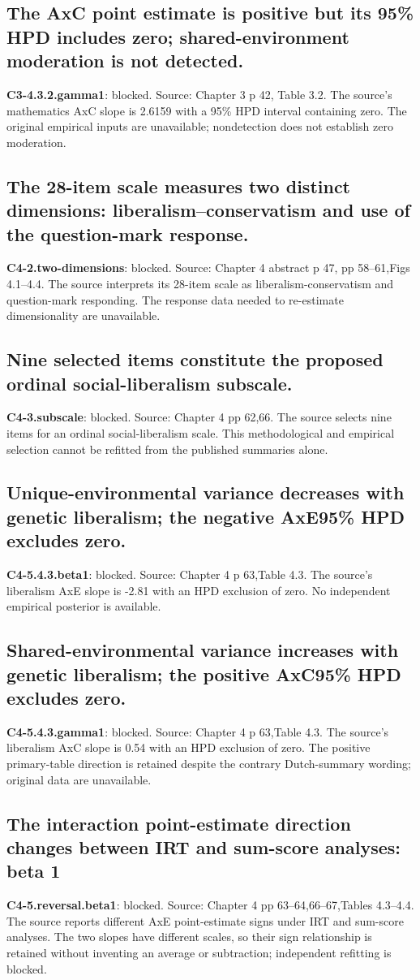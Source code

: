 \documentclass[11pt]{article}
\begin{document}
\subsection{The AxC point estimate is positive but its 95\% HPD includes zero; shared-environment moderation is not detected.}
\textbf{C3-4.3.2.gamma1}: blocked. Source: Chapter 3 p 42, Table 3.2. The source's mathematics AxC slope is 2.6159 with a 95\% HPD interval containing zero. The original empirical inputs are unavailable; nondetection does not establish zero moderation.
\subsection{The 28-item scale measures two distinct dimensions: liberalism--conservatism and use of the question-mark response.}
\textbf{C4-2.two-dimensions}: blocked. Source: Chapter 4 abstract p 47, pp 58--61,Figs 4.1--4.4. The source interprets its 28-item scale as liberalism-conservatism and question-mark responding. The response data needed to re-estimate dimensionality are unavailable.
\subsection{Nine selected items constitute the proposed ordinal social-liberalism subscale.}
\textbf{C4-3.subscale}: blocked. Source: Chapter 4 pp 62,66. The source selects nine items for an ordinal social-liberalism scale. This methodological and empirical selection cannot be refitted from the published summaries alone.
\subsection{Unique-environmental variance decreases with genetic liberalism; the negative AxE95\% HPD excludes zero.}
\textbf{C4-5.4.3.beta1}: blocked. Source: Chapter 4 p 63,Table 4.3. The source's liberalism AxE slope is -2.81 with an HPD exclusion of zero. No independent empirical posterior is available.
\subsection{Shared-environmental variance increases with genetic liberalism; the positive AxC95\% HPD excludes zero.}
\textbf{C4-5.4.3.gamma1}: blocked. Source: Chapter 4 p 63,Table 4.3. The source's liberalism AxC slope is 0.54 with an HPD exclusion of zero. The positive primary-table direction is retained despite the contrary Dutch-summary wording; original data are unavailable.
\subsection{The interaction point-estimate direction changes between IRT and sum-score analyses: beta 1}
\textbf{C4-5.reversal.beta1}: blocked. Source: Chapter 4 pp 63--64,66--67,Tables 4.3--4.4. The source reports different AxE point-estimate signs under IRT and sum-score analyses. The two slopes have different scales, so their sign relationship is retained without inventing an average or subtraction; independent refitting is blocked.
\end{document}
